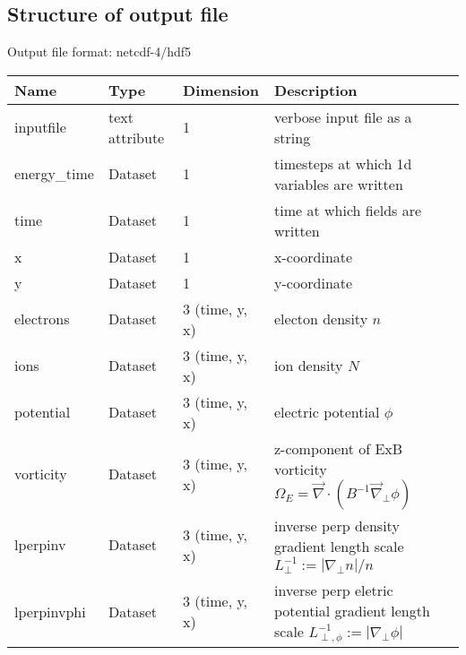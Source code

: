 \subsection{Structure of output file}
Output file format: netcdf-4/hdf5
%
\begin{longtable}{lll>{\RaggedRight}p{7cm}}
\toprule
\rowcolor{gray!50}\textbf{Name} &
 \textbf{Type} & \textbf{Dimension} & \textbf{Description}  \\ \midrule
inputfile  &             text attribute & 1 & verbose input file as a string \\
energy\_time             & Dataset & 1 & timesteps at which 1d variables are written \\
time                     & Dataset & 1 & time at which fields are written \\
x                        & Dataset & 1 & x-coordinate  \\
y                        & Dataset & 1 & y-coordinate \\
electrons                & Dataset & 3 (time, y, x) & electon density $n$ \\
ions                     & Dataset & 3 (time, y, x) & ion density $N$ \\
potential                & Dataset & 3 (time, y, x) & electric potential $\phi$  \\
vorticity                & Dataset & 3 (time, y, x) & z-component of ExB vorticity  $\Omega_E = \vec{\nabla}\cdot (B^{-1} \vec{\nabla}_{\perp}\phi)$  \\
lperpinv                 & Dataset & 3 (time, y, x) & inverse perp density gradient length scale $L_\perp^{-1} := |\nabla_\perp n| / n$ \\
lperpinvphi                 & Dataset & 3 (time, y, x) & inverse perp eletric potential gradient length scale $L_{\perp,\phi}^{-1} := |\nabla_\perp \phi| $ \\
\bottomrule
\end{longtable}




